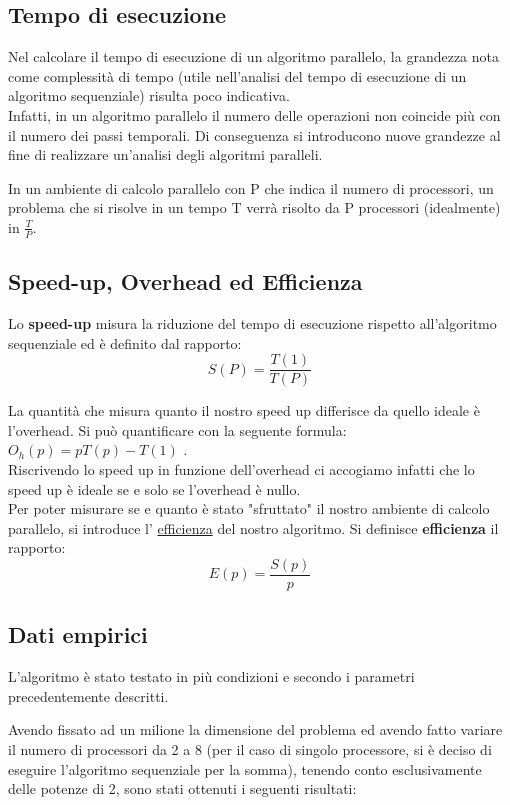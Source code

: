 \subsection{Tempo di esecuzione}

Nel calcolare il tempo di esecuzione di un algoritmo parallelo, la grandezza nota come complessità di tempo (utile nell'analisi del tempo di esecuzione di un algoritmo sequenziale) risulta poco indicativa.\\
Infatti, in un algoritmo parallelo il numero delle operazioni non coincide più con il numero dei passi temporali. Di conseguenza si introducono nuove grandezze al fine di realizzare un'analisi degli algoritmi paralleli.

In un ambiente di calcolo parallelo con P che indica il numero di processori, un problema che si risolve in un tempo T verrà risolto da P processori (idealmente) in $\frac{T}{P}$.


\subsection{Speed-up, Overhead ed Efficienza}

Lo \textbf{speed-up} misura la riduzione del tempo di esecuzione rispetto all'algoritmo sequenziale ed è definito dal rapporto:
$$ S(P) = \frac{T(1)}{T(P)} $$ 


La quantità che misura quanto il nostro speed up differisce da quello ideale è l'overhead. Si può quantificare con la seguente formula: $O_h(p) = pT(p) - T(1)$ .\\
Riscrivendo lo speed up in funzione dell'overhead ci accogiamo infatti che lo speed up è ideale se e solo se l'overhead è nullo.\\

Per poter misurare se e quanto è stato "sfruttato" il nostro ambiente di calcolo parallelo, si introduce l' \underline{efficienza} del nostro algoritmo.
Si definisce \textbf{efficienza} il rapporto: $$ E(p) = \frac{S(p)}{p} $$

\subsection{Dati empirici}
L'algoritmo è stato testato in più condizioni e secondo i parametri precedentemente descritti.

Avendo fissato ad un milione la dimensione del problema ed avendo fatto variare il numero di processori da 2 a 8 (per il caso di singolo processore, si è deciso di eseguire l'algoritmo sequenziale per la somma), tenendo conto esclusivamente delle potenze di 2, sono stati ottenuti i seguenti risultati:

